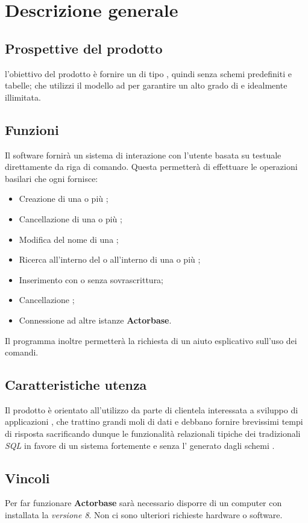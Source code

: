 \documentclass{scalatekids-article}
\begin{document}
\section{Descrizione generale}
\subsection{Prospettive del prodotto}
l'obiettivo del prodotto è fornire un   di tipo
, quindi senza schemi predefiniti e tabelle; che utilizzi il
modello ad  per garantire un alto grado di  e
 idealmente illimitata.
\subsection{Funzioni}
Il software fornirà un sistema di interazione con l'utente basata su 
testuale direttamente da riga di comando. Questa permetterà di effettuare le operazioni
basilari che ogni  fornisce:
\begin{itemize}
\item Creazione di una o più ;
\item Cancellazione di una o più ;
\item Modifica del nome di una ;
\item Ricerca all'interno del  o all'interno di una o più ;
\item Inserimento  con o senza sovrascrittura;
\item Cancellazione ;
\item Connessione ad altre istanze \textbf{Actorbase}.
\end{itemize}
Il programma inoltre permetterà la richiesta di un aiuto esplicativo sull'uso
dei comandi.
\subsection{Caratteristiche utenza}
Il prodotto è orientato all'utilizzo da parte di clientela interessata a
sviluppo di applicazioni , che trattino grandi moli di dati e
debbano fornire brevissimi tempi di risposta sacrificando dunque le
funzionalità relazionali tipiche dei tradizionali  \textit{SQL} in
favore di un sistema fortemente  e senza l' generato
dagli schemi .
\subsection{Vincoli}
Per far funzionare \textbf{Actorbase} sarà necessario disporre di un computer con
installata la \textit{ versione 8}. Non ci sono ulteriori richieste hardware o software.
\end{document}
